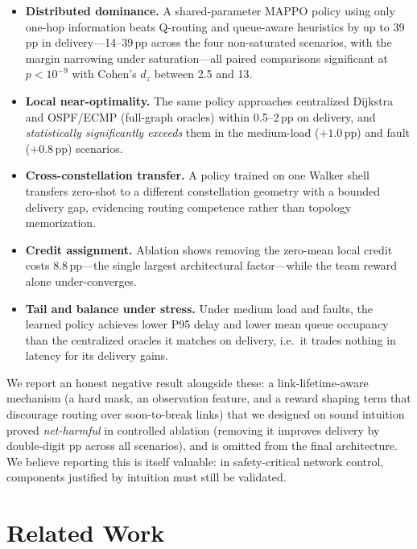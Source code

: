 \documentclass[conference,10pt]{IEEEtran}
\begin{document}
\begin{itemize}
  \item[\textbf{C1}] \textbf{Distributed dominance.} A shared-parameter MAPPO policy using only one-hop information beats Q-routing and queue-aware heuristics by up to 39\,pp in delivery---14--39\,pp across the four non-saturated scenarios, with the margin narrowing under saturation---all paired comparisons significant at $p<10^{-9}$ with Cohen's $d_z$ between 2.5 and 13.
  \item[\textbf{C2}] \textbf{Local near-optimality.} The same policy approaches centralized Dijkstra and OSPF/ECMP (full-graph oracles) within 0.5--2\,pp on delivery, and \emph{statistically significantly exceeds} them in the medium-load ($+1.0$\,pp) and fault ($+0.8$\,pp) scenarios.
  \item[\textbf{C3}] \textbf{Cross-constellation transfer.} A policy trained on one Walker shell transfers zero-shot to a different constellation geometry with a bounded delivery gap, evidencing routing competence rather than topology memorization.
  \item[\textbf{C4}] \textbf{Credit assignment.} Ablation shows removing the zero-mean local credit costs 8.8\,pp---the single largest architectural factor---while the team reward alone under-converges.
  \item[\textbf{C5}] \textbf{Tail and balance under stress.} Under medium load and faults, the learned policy achieves lower P95 delay and lower mean queue occupancy than the centralized oracles it matches on delivery, i.e.\ it trades nothing in latency for its delivery gains.
\end{itemize}

We report an honest negative result alongside these: a link-lifetime-aware mechanism (a hard mask, an observation feature, and a reward shaping term that discourage routing over soon-to-break links) that we designed on sound intuition proved \emph{net-harmful} in controlled ablation (removing it improves delivery by double-digit pp across all scenarios), and is omitted from the final architecture. We believe reporting this is itself valuable: in safety-critical network control, components justified by intuition must still be validated.

\section{Related Work}
\end{document}
